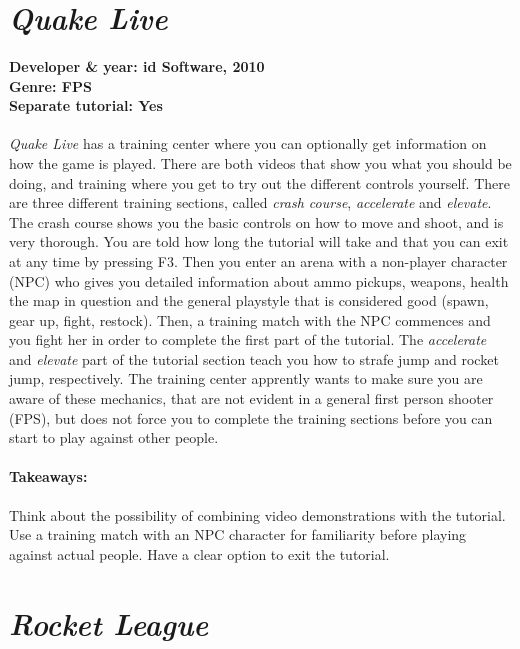 \section{\textit{Quake Live}}
\paragraph{Developer \& year: id Software, 2010 \\ Genre: FPS \\ Separate tutorial: Yes \\}
\textit{Quake Live} has a training center where you can optionally get information on how the game is played. There are both videos that show you what you should be doing, and training where you get to try out the different controls yourself. There are three different training sections, called \textit{crash course}, \textit{accelerate} and \textit{elevate}. The crash course shows you the basic controls on how to move and shoot, and is very thorough. You are told how long the tutorial will take and that you can exit at any time by pressing F3. Then you enter an arena with a non-player character (NPC) who gives you detailed information about ammo pickups, weapons, health the map in question and the general playstyle that is considered good (spawn, gear up, fight, restock). Then, a training match with the NPC commences and you fight her in order to complete the first part of the tutorial. The \textit{accelerate} and \textit{elevate} part of the tutorial section teach you how to strafe jump and rocket jump, respectively. The training center apprently wants to make sure you are aware of these mechanics, that are not evident in a general first person shooter (FPS), but does not force you to complete the training sections before you can start to play against other people.
\paragraph{Takeaways:}
Think about the possibility of combining video demonstrations with the tutorial.
Use a training match with an NPC character for familiarity before playing against actual people. Have a clear option to exit the tutorial.

\section{\textit{Rocket League}}

